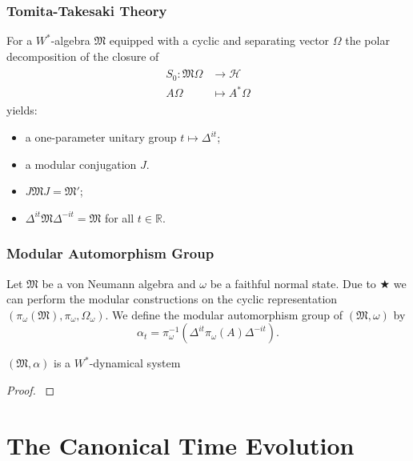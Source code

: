 \documentclass{beamer}
\begin{document}
\begin{frame}
	\frametitle{Tomita-Takesaki Theory}
	For a $W^*$-algebra $\mathfrak{M}$ equipped with a cyclic and separating vector $\Omega$ the polar decomposition of the closure of
	\begin{align}
	\begin{split}
		S_0:\mathfrak{M}\Omega&\rightarrow\mathcal{H}\\
		A\Omega&\mapsto A^*\Omega
	\end{split}
	\end{align}
	yields:
	\begin{itemize}
		\item a one-parameter unitary group $t\mapsto\Delta^{it}$;
		\item a modular conjugation $J$.
	\end{itemize}
	\begin{theorem}
		\begin{itemize}
			\item $J\mathfrak{M}J=\mathfrak{M}'$;
			\item $\Delta^{it}\mathfrak{M}\Delta^{-it}=\mathfrak{M}$ for all $t\in\mathbb{R}$. 	
		\end{itemize}
	\end{theorem}
\end{frame}

\begin{frame}
	\frametitle{Modular Automorphism Group}
	\begin{definition}
		Let $\mathfrak{M}$ be a von Neumann algebra and $\omega$ be a faithful normal state. Due to $\bigstar$ we can perform the modular constructions on the cyclic representation $(\pi_\omega(\mathfrak{M}),\pi_\omega,\Omega_\omega)$. We define the modular automorphism group of $(\mathfrak{M},\omega)$ by 
		\begin{equation}
			\alpha_t=\pi_\omega^{-1}(\Delta^{it}\pi_\omega(A)\Delta^{-it}).
		\end{equation}
	\end{definition}
	\begin{theorem}[$\bigstar\bigstar$]
		$(\mathfrak{M},\alpha)$ is a $W^*$-dynamical system  
	\end{theorem}		
	\begin{proof}
		\cite{Duvenhage1999}
	\end{proof}
\end{frame}

\section{The Canonical Time Evolution}
\end{document}
